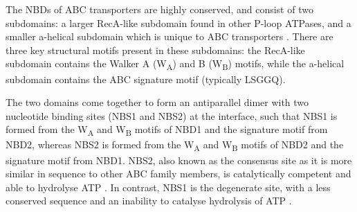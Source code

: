 The NBDs of ABC transporters are highly conserved, and consist of two subdomains: a larger RecA-like subdomain found in other P-loop ATPases, and a smaller \textgreek{a}-helical subdomain which is unique to ABC transporters \cite{ter_beek_structural_2014, puljung_cryo-electron_2018}.
There are three key structural motifs present in these subdomains: the RecA-like subdomain contains the Walker A (W\textsubscript{A}) and B (W\textsubscript{B}) motifs, while the \textgreek{a}-helical subdomain contains the ABC signature motif (typically LSGGQ).

The two domains come together to form an antiparallel dimer with two nucleotide binding sites (NBS1 and NBS2) at the interface, such that NBS1 is formed from the W\textsubscript{A} and W\textsubscript{B} motifs of NBD1 and the signature motif from NBD2, whereas NBS2 is formed from the W\textsubscript{A} and W\textsubscript{B} motifs of NBD2 and the signature motif from NBD1.
NBS2, also known as the consensus site as it is more similar in sequence to other ABC family members, is catalytically competent and able to hydrolyse ATP \cite{matsuo_atp_1999, zingman_signaling_2001, de_wet_studies_2007}.
In contrast, NBS1 is the degenerate site, with a less conserved sequence and an inability to catalyse hydrolysis of ATP \cite{ter_beek_structural_2014, puljung_cryo-electron_2018}.

